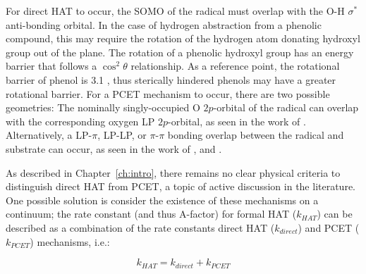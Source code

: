 \begin{doublespace}
For direct HAT to occur, the SOMO of the radical must overlap with the O-H
$\sigma^*$ anti-bonding orbital. In the case of hydrogen abstraction from a
phenolic compound, this may require the rotation of the hydrogen atom donating
hydroxyl group out of the plane. The rotation of a phenolic hydroxyl group has
an energy barrier that follows a $\cos^2 \theta$ relationship.\cite{Kojima1960}
As a reference point, the rotational barrier of phenol\cite{Kim1994} is 3.1
\kcalmol, thus sterically hindered phenols may have a greater rotational
barrier. For a PCET mechanism to occur, there are two possible geometries: The
nominally singly-occupied O $2p$-orbital of the radical can overlap with the
corresponding oxygen LP $2p$-orbital, as seen in the work of \citet{Mayer2002}.
Alternatively, a LP-$\pi$, LP-LP, or $\pi$-$\pi$ bonding overlap between the
radical and substrate can occur, as seen in the work of \citet{DiLabio2005}, and
\citet{DiLabio2007}.

As described in Chapter~\ref{ch:intro}, there remains no clear physical criteria
to distinguish direct HAT from PCET, a topic of active discussion in the
literature.\cite{Cukier1998, Mayer2002, Stubbe2003, Mayer2004, DiLabio2007,
Huynh2007, HammesSchiffer2008, Mayer2010, Weinberg2012, HammesSchiffer2015,
MunozRugeles2017} One possible solution is consider the existence of these
mechanisms on a continuum; the rate constant (and thus A-factor) for
formal HAT ($k_{HAT}$) can be described as a combination of the rate constants
direct HAT ($k_{direct}$) and PCET ($k_{PCET}$) mechanisms, i.e.:

\begin{equation}
  k_{HAT} = k_{direct} + k_{PCET}
  \label{eq:A-theory}
\end{equation}


\end{doublespace}
